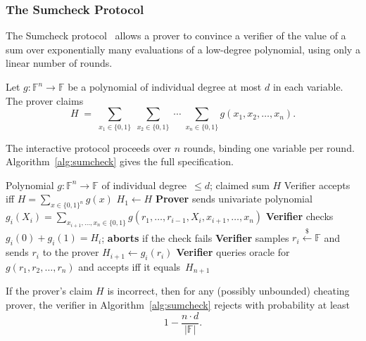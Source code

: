 \subsubsection{The Sumcheck Protocol}\label{sec:bg-sumcheck}

The Sumcheck protocol~\cite{sumcheck} allows a prover to convince a verifier
of the value of a sum over exponentially many evaluations of a low-degree
polynomial, using only a linear number of rounds.

\begin{definition}\label{def:sumcheck}
Let $g \colon \mathbb{F}^n \to \mathbb{F}$ be a polynomial of individual
degree at most $d$ in each variable.  The prover claims
\begin{equation}\label{eq:sumcheck-claim}
  H \;=\; \sum_{x_1 \in \{0,1\}} \;\sum_{x_2 \in \{0,1\}} \;\cdots\;
  \sum_{x_n \in \{0,1\}} g(x_1, x_2, \ldots, x_n).
\end{equation}
\end{definition}

\noindent
The interactive protocol proceeds over $n$ rounds, binding one variable per
round.  Algorithm~\ref{alg:sumcheck} gives the full specification.

\begin{algorithm}[t]
  \caption{The Sumcheck Protocol}\label{alg:sumcheck}
  \begin{algorithmic}[1]
    \Require Polynomial $g \colon \mathbb{F}^n \to \mathbb{F}$ of individual
             degree~$\leq d$; claimed sum $H$
    \Ensure Verifier accepts iff $H = \sum_{x \in \{0,1\}^n} g(x)$
    \State $H_1 \gets H$
      \State \textbf{Prover} sends univariate polynomial
             $g_i(X_i) = \displaystyle\sum_{x_{i+1}, \ldots, x_n \in \{0,1\}}
             g(r_1, \ldots, r_{i-1}, X_i, x_{i+1}, \ldots, x_n)$
      \State \textbf{Verifier} checks $g_i(0) + g_i(1) = H_i$;
             \textbf{aborts} if the check fails
      \State \textbf{Verifier} samples $r_i \xleftarrow{\$} \mathbb{F}$
             and sends $r_i$ to the prover
      \State $H_{i+1} \gets g_i(r_i)$
    \EndFor
    \State \textbf{Verifier} queries oracle for
           $g(r_1, r_2, \ldots, r_n)$ and accepts iff it equals~$H_{n+1}$
  \end{algorithmic}
\end{algorithm}

\begin{theorem}\label{thm:sumcheck-soundness}
If the prover's claim $H$ is incorrect, then for any (possibly unbounded)
cheating prover, the verifier in Algorithm~\ref{alg:sumcheck} rejects with
probability at least
\begin{equation}\label{eq:sumcheck-soundness}
  1 - \frac{n \cdot d}{\lvert\mathbb{F}\rvert}.
\end{equation}
\end{theorem}

